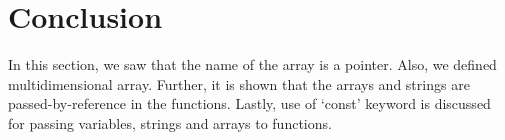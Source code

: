 




\section{Conclusion}
In this section, we saw that the name of the array is a pointer. Also, we defined multidimensional array. Further, it is shown that the arrays and strings are passed-by-reference in the functions. Lastly, use of `const' keyword is discussed for passing variables, strings and arrays to functions. 